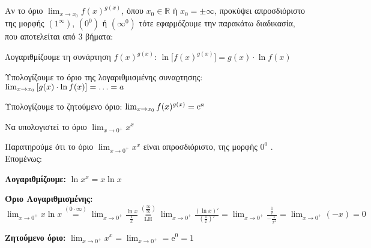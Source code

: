 Αν το όριο $ \lim_{x \to x_{0}} f(x)^{g(x)} $, όπου $ x_{0} \in
\mathbb{R} $ ή $ x_{0}= \pm \infty $, προκύψει απροσδιόριστο της μορφής 
$ (1^{\infty}) $, $ (0^0) $ ή $ (\infty^{0}) $ 
τότε εφαρμόζουμε την παρακάτω διαδικασία, που αποτελείται από 3 βήματα:
\begin{myitemize}
  \item \textcolor{Col1}{Λογαριθμίζουμε τη συνάρτηση $ f(x)^{g(x)} $:} $ \ln{\bigl[f(x)^{g(x)}\bigr]} = g(x)\cdot \ln{f(x)} $
  \item \textcolor{Col1}{Υπολογίζουμε το όριο της λογαριθμισμένης συναϱτησης:} 
    $ \lim_{\smash{x \to x_{0}}} \left[g(x)\cdot \ln{f(x)}\right] = \ldots = a $
  \item \textcolor{Col1}{Υπολογίζουμε το ζητούμενο όριο:} 
    $ \lim_{x \to x_{0}} \smash{f(x)^{g(x)}} = \mathrm{e}^{a} $
\end{myitemize}


\begin{example}
  Να υπολογιστεί το όριο $ \lim_{x \to 0^{+}} x^{x} $
\end{example}
\begin{solution}
  Παρατηρούμε ότι το όριο $ \lim_{x \to 0^{+}} x^{x} $ είναι απροσδιόριστο, της μορφής 
  $ 0^{0} $ . Επομένως:
  \begin{myitemize}
    \item \textbf{Λογαριθμίζουμε:} $ \ln{x^{x}} = x \ln{x} $
    \item \textbf{Όριο Λογαριθμισμένης:} $ \lim_{x \to 0^{+}} x \ln{x} \overset{(0 \cdot
      \infty)}{=} \lim_{x \to 0^{+}} \frac{\ln{x}}{\frac{1}{x}}
      \overset{\left(\frac{\infty}{\infty}\right)}{\underset{\mathrm{LH}}{=}}  
      \lim_{x \to 0^{+}} \frac{(\ln{x} )'}{(\frac{1}{x} )'} = \lim_{x \to 0^{+}}
      \frac{\frac{1}{x}}{- \frac{1}{x^{2}}} = \lim_{x \to 0^{+}} (-x) = 0 $
    \item \textbf{Ζητούμενο όριο:} $ \lim_{x \to 0^{+}} x^{x} = \lim_{x \to 0^{+}} = 
      \mathrm{e}^{0} = 1 $ 
  \end{myitemize}
\end{solution}

